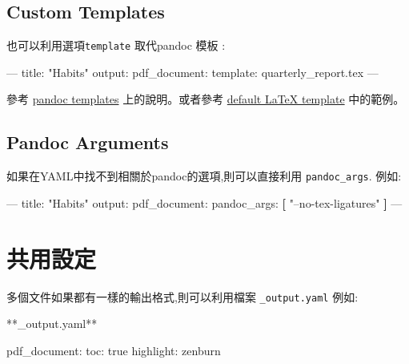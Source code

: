 \documentclass[]{book}
\newenvironment{Shaded}{\begin{snugshade}}{\end{snugshade}}
\newcommand{\AttributeTok}[1]{\textcolor[rgb]{0.77,0.63,0.00}{#1}}
\newcommand{\FunctionTok}[1]{\textcolor[rgb]{0.00,0.00,0.00}{#1}}
\newcommand{\KeywordTok}[1]{\textcolor[rgb]{0.13,0.29,0.53}{\textbf{#1}}}
\newcommand{\OtherTok}[1]{\textcolor[rgb]{0.56,0.35,0.01}{#1}}
\newcommand{\StringTok}[1]{\textcolor[rgb]{0.31,0.60,0.02}{#1}}
\theoremstyle{definition}
\theoremstyle{definition}
\theoremstyle{definition}
\theoremstyle{remark}
\begin{document}
\hypertarget{custom-templates}{%
\subsection{Custom Templates}\label{custom-templates}}

也可以利用選項\texttt{template} 取代pandoc 模板 :

\begin{Shaded}
\begin{Highlighting}[]
\OtherTok{---}
\FunctionTok{title:}\AttributeTok{ }\StringTok{"Habits"}
\FunctionTok{output:}
  \FunctionTok{pdf_document:}
    \FunctionTok{template:}\AttributeTok{ quarterly_report.tex}
\OtherTok{---}
\end{Highlighting}
\end{Shaded}

參考 \href{http://pandoc.org/README.html\#templates}{pandoc templates}
上的說明。或者參考
\href{https://github.com/jgm/pandoc-templates/blob/master/default.latex}{default
LaTeX template} 中的範例。

\hypertarget{pandoc-arguments}{%
\subsection{Pandoc Arguments}\label{pandoc-arguments}}

如果在YAML中找不到相關於pandoc的選項,則可以直接利用
\texttt{pandoc\_args}. 例如:

\begin{Shaded}
\begin{Highlighting}[]
\OtherTok{---}
\FunctionTok{title:}\AttributeTok{ }\StringTok{"Habits"}
\FunctionTok{output:}
  \FunctionTok{pdf_document:}
    \FunctionTok{pandoc_args:}\AttributeTok{ }\KeywordTok{[}
      \StringTok{"--no-tex-ligatures"}
    \KeywordTok{]}
\OtherTok{---}
\end{Highlighting}
\end{Shaded}

\section{共用設定}

多個文件如果都有一樣的輸出格式,則可以利用檔案 \texttt{\_output.yaml}
例如:

**\_output.yaml**

\begin{Shaded}
\begin{Highlighting}[]
\FunctionTok{pdf_document:}
  \FunctionTok{toc:}\AttributeTok{ true}
  \FunctionTok{highlight:}\AttributeTok{ zenburn}
\end{Highlighting}
\end{Shaded}
\end{document}
